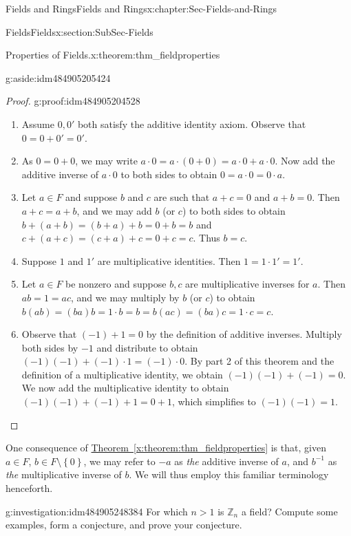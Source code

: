 \documentclass[oneside,10pt,]{book}
\newcommand{\xreffont}{\relax}
\numberwithin{equation}{section}
\newcommand{\set}[1]{\left\{ {#1} \right\}}
\def\Z{{\mathbb Z}}
\begin{document}
\begin{chapterptx}{Fields and Rings}{}{Fields and Rings}{}{}{x:chapter:Sec-Fields-and-Rings}
\begin{sectionptx}{Fields}{}{Fields}{}{}{x:section:SubSec-Fields}
\begin{theorem}{Properties of Fields.}{}{x:theorem:thm_fieldproperties}
\begin{enumerate}
\begin{aside}{}{g:aside:idm484905205424}%
\end{aside}
%
\end{enumerate}
%
\end{theorem}
\begin{proof}{}{g:proof:idm484905204528}
%
\begin{enumerate}
\item{}Assume \(0, 0'\) both satisfy the additive identity axiom. Observe that \(0 = 0 + 0' = 0'\).%
\item{}As \(0 = 0 + 0\), we may write \(a\cdot 0 = a\cdot (0 + 0) = a\cdot 0 + a \cdot 0\). Now add the additive inverse of \(a\cdot 0\) to both sides to obtain \(0 = a \cdot 0 = 0\cdot a\).%
\item{}Let \(a\in F\) and suppose \(b\) and \(c\) are such that \(a+c = 0\) and \(a+b = 0\). Then \(a+c = a+b\), and we may add \(b\) (or \(c\)) to both sides to obtain \(b+(a+b) = (b+a)+b = 0 + b = b\) and \(c+(a+c) = (c+a)+c = 0 + c = c\). Thus \(b=c\).%
\item{}Suppose \(1\) and \(1'\) are multiplicative identities. Then \(1 = 1 \cdot 1' = 1'\).%
\item{}Let \(a\in F\) be nonzero and suppose \(b,c\) are multiplicative inverses for \(a\). Then \(ab = 1 = ac\), and we may multiply by \(b\) (or \(c\)) to obtain \(b(ab) = (ba)b = 1\cdot b = b = b(ac) = (ba)c = 1\cdot c = c\).%
\item{}Observe that \((-1) + 1 = 0\) by the definition of additive inverses. Multiply both sides by \(-1\) and distribute to obtain \((-1)(-1) + (-1)\cdot 1 = (-1)\cdot 0\). By part 2 of this theorem and the definition of a multiplicative identity, we obtain \((-1)(-1) + (-1) = 0\). We now add the multiplicative identity to obtain \((-1)(-1) + (-1) + 1 = 0 + 1\), which simplifies to \((-1)(-1) = 1\).%
\end{enumerate}
\end{proof}
One consequence of \hyperref[x:theorem:thm_fieldproperties]{Theorem~{\xreffont\ref{x:theorem:thm_fieldproperties}}} is that, given \(a\in F\), \(b\in F\setminus \set{0}\), we may refer to \(-a\) as \emph{the} additive inverse of \(a\), and \(b^{-1}\) as \emph{the} multiplicative inverse of \(b\). We will thus employ this familiar terminology henceforth.%
\begin{investigation}{}{g:investigation:idm484905248384}%
For which \(n > 1\) is \(\Z_n\) a field? Compute some examples, form a conjecture, and prove your conjecture.%
\end{investigation}

\end{sectionptx}
\end{chapterptx}
\end{document}
